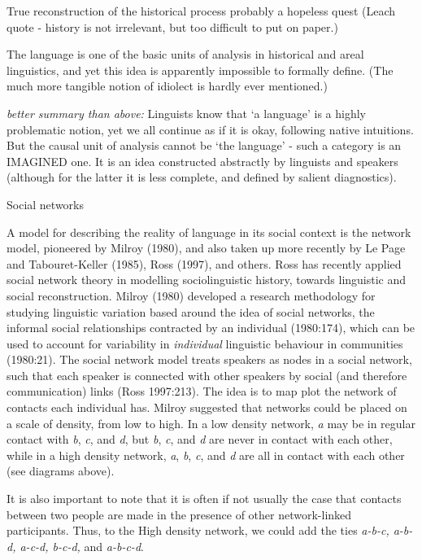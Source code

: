 True reconstruction of the historical process probably a hopeless quest (Leach quote - history is not irrelevant, but too difficult to put on paper.)

 The language is one of the basic units of analysis in historical and areal linguistics, and yet this idea is apparently impossible to formally define. (The much more tangible notion of idiolect is hardly ever mentioned.)


\textit{better summary than above:
}Linguists know that \textquoteleft a language' is a highly problematic notion, yet we all continue as if it is okay, following native intuitions. But the causal unit of analysis cannot be \textquoteleft the language' - such a category is an IMAGINED one. It is an idea constructed abstractly by linguists and speakers (although for the latter it is less complete, and defined by salient diagnostics). 

Social networks

A model for describing the reality of language in its social context is the network model, pioneered by Milroy (1980), and also taken up more recently by Le Page and Tabouret-Keller (1985), Ross (1997), and others. Ross has recently applied social network theory in modelling sociolinguistic history, towards linguistic and social reconstruction. 
	Milroy (1980) developed a research methodology for studying linguistic variation based around the idea of social networks, the informal social relationships contracted by an individual (1980:174), which can be used to account for variability in \textit{individual }linguistic behaviour in communities (1980:21). The social network model treats speakers as nodes in a social network, such that each speaker is connected with other speakers by social (and therefore communication) links (Ross 1997:213). The idea is to map plot the network of contacts each individual has. Milroy suggested that networks could be placed on a scale of density, from low to high. In a low density network, \textit{a} may be in regular contact with \textit{b}, \textit{c}, and \textit{d}, but \textit{b}, \textit{c}, and \textit{d} are never in contact with each other, while in a high density network, \textit{a}, \textit{b}, \textit{c}, and \textit{d} are all in contact with each other (see diagrams above).

It is also important to note that it is often if not usually the case that contacts between two people are made in the presence of other network-linked participants. Thus, to the High density network, we could add the ties \textit{a-b-c, a-b-d, a-c-d, b-c-d, }and \textit{a-b-c-d}.

